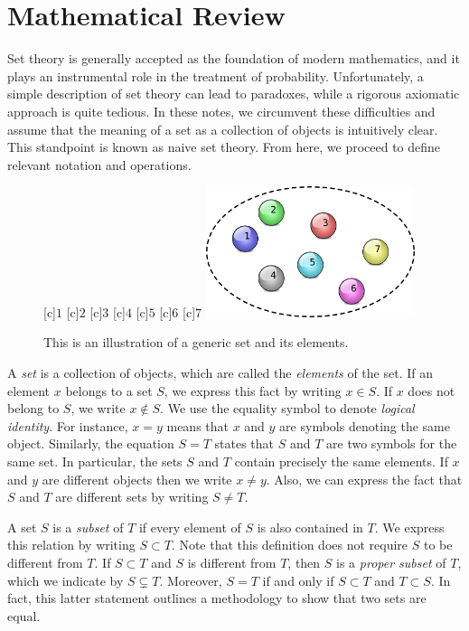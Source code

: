 \chapter{Mathematical Review}

Set theory is generally accepted as the foundation of modern mathematics, and it plays an instrumental role in the treatment of probability.
Unfortunately, a simple description of set theory can lead to paradoxes, while a rigorous axiomatic approach is quite tedious.
In these notes, we circumvent these difficulties and assume that the meaning of a set as a collection of objects is intuitively clear.
This standpoint is known as naive set theory.
From here, we proceed to define relevant notation and operations.

\begin{figure}[htb]
\begin{center}
\begin{psfrags}
[c]{$1$}
[c]{$2$}
[c]{$3$}
[c]{$4$}
[c]{$5$}
[c]{$6$}
[c]{$7$}
\includegraphics[height=3.825cm]{Figures/1Chapter/basicset}
\end{psfrags}
\caption{This is an illustration of a generic set and its elements.}
\end{center}
\end{figure}

A \emph{set} is a collection of objects, which are called the \emph{elements} of the set.
If an element $x$ belongs to a set $S$, we express this fact by writing $x \in S$.
If $x$ does not belong to $S$, we write $x \notin S$.
We use the equality symbol to denote \emph{logical identity}.
For instance, $x = y$ means that $x$ and $y$ are symbols denoting the same object.
Similarly, the equation $S = T$ states that $S$ and $T$ are two symbols for the same set.
In particular, the sets $S$ and $T$ contain precisely the same elements.
If $x$ and $y$ are different objects then we write $x \neq y$.
Also, we can express the fact that $S$ and $T$ are different sets by writing $S \neq T$.

A set $S$ is a \emph{subset} of $T$ if every element of $S$ is also contained in $T$.
We express this relation by writing $S \subset T$.
Note that this definition does not require $S$ to be different from $T$.
If $S \subset T$ and $S$ is different from $T$, then $S$ is a \emph{proper subset} of $T$, which we indicate by $S \subsetneq T$.
Moreover, $S = T$ if and only if $S \subset T$ and $T \subset S$.
In fact, this latter statement outlines a methodology to show that two sets are equal.

